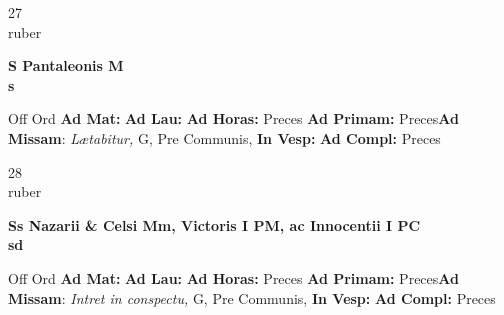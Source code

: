 \documentclass[10pt, openany]{book}
\begin{document}
    \begin{center}
        \begin{minipage}{3.5in}
            \vspace{2em}
            \begin{minipage}{0.5in}
                {\Huge 27} \\
                {\normalsize ruber}
            \end{minipage}
            \begin{minipage}{3.0in}
                \textbf{ \large S Pantaleonis M \\
                \textnormal{\normalsize s}}

            \end{minipage}
            \begin{justify}Off Ord
                \textbf{Ad Mat: }
                \textbf{Ad Lau: }
                \textbf{Ad Horas: }Preces
                \textbf{Ad Primam: }Preces\textbf{Ad Missam}: \textit{Lætabitur,} G, Pre Communis, 
                \textbf{In Vesp: }
                \textbf{Ad Compl: }Preces
            \end{justify}
        \end{minipage}
    \end{center}

    \begin{center}
        \begin{minipage}{3.5in}
            \vspace{2em}
            \begin{minipage}{0.5in}
                {\Huge 28} \\
                {\normalsize ruber}
            \end{minipage}
            \begin{minipage}{3.0in}
                \textbf{ \large Ss Nazarii \& Celsi Mm, Victoris I PM, ac Innocentii I PC \\
                \textnormal{\normalsize sd}}

            \end{minipage}
            \begin{justify}Off Ord
                \textbf{Ad Mat: }
                \textbf{Ad Lau: }
                \textbf{Ad Horas: }Preces
                \textbf{Ad Primam: }Preces\textbf{Ad Missam}: \textit{Intret in conspectu,} G, Pre Communis, 
                \textbf{In Vesp: }
                \textbf{Ad Compl: }Preces
            \end{justify}
        \end{minipage}
    \end{center}
\end{document}
